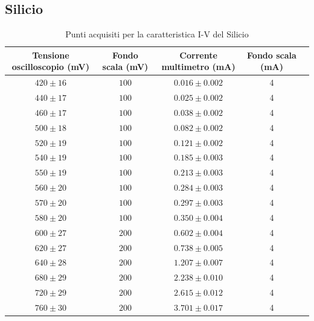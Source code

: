 \documentclass[]{article}
\begin{document}
\subsection{Silicio}
\begin{center}
	\begin{table}[H]
	\begin{tabular}{|c|c|c|c|c|}
		\hline
		Tensione oscilloscopio (mV)& Fondo scala (mV) & Corrente multimetro (mA) &Fondo scala (mA)\\
		\hline
		$ 420\pm 16 $ &$ 100 $ & $ 0.016\pm 0.002 $ &4\\
		\hline
		$440\pm17 $ &$ 100 $ & $ 0.025\pm0.002 $ &4 \\
		\hline
		$ 460\pm 17 $ &$ 100 $ & $ 0.038\pm 0.002 $ &4 \\
		\hline
		$ 500\pm 18 $ &$ 100 $ & $ 0.082\pm 0.002 $ &4 \\
		\hline
		$ 520\pm 19 $ &$ 100 $ & $0.121\pm 0.002$ &4 \\
		\hline
		$ 540\pm 19 $ &$ 100 $ & $ 0.185\pm 0.003 $ &4 \\
		\hline
		$ 550\pm 19 $ &$ 100 $ & $ 0.213\pm 0.003 $ &4 \\
		\hline
		$ 560\pm 20 $ &$ 100 $ & $ 0.284\pm 0.003 $ &4 \\
		\hline
		$ 570\pm 20 $ &$ 100 $ & $ 0.297\pm 0.003 $ &4 \\
		\hline
		$ 580\pm 20 $ &$ 100 $ & $ 0.350\pm 0.004 $ &4 \\
		\hline
		$ 600\pm 27 $ &$ 200 $ & $ 0.602\pm0.004 $  &4\\
		\hline
		$ 620\pm 27 $ &$ 200 $ & $ 0.738\pm0.005 $  &4\\
		\hline
		$ 640\pm 28 $ &$ 200 $ & $ 1.207\pm0.007 $  &4\\
		\hline
		$ 680\pm 29 $ &$ 200 $ & $ 2.238\pm 0.010 $ &4 \\
		\hline
		$ 720\pm 29 $ &$ 200 $ & $ 2.615\pm 0.012 $ &4 \\
		\hline
		$ 760\pm 30 $ &$ 200 $ & $ 3.701\pm 0.017 $ &4 \\
		\hline
			\end{tabular}
		\caption{Punti acquisiti per la caratteristica I-V del Silicio}
		\label{tab:silicio}
	\end{table}
	\end{center}
\end{document}
